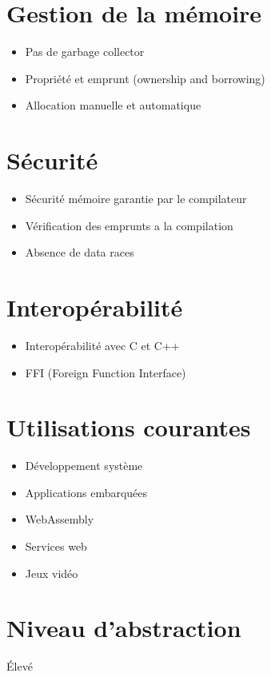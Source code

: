 \documentclass{article}
\begin{document}
\section{Gestion de la mémoire \cite{noauthor_what_nodate}} 
\begin{itemize}
    \item Pas de garbage collector
    \item Propriété et emprunt (ownership and borrowing)
    \item Allocation manuelle et automatique
\end{itemize}

\section{Sécurité}
\begin{itemize}
    \item Sécurité mémoire garantie par le compilateur
    \item Vérification des emprunts a la compilation
    \item Absence de data races
\end{itemize}

\section{Interopérabilité}
\begin{itemize}
    \item Interopérabilité avec C et C++
    \item FFI (Foreign Function Interface)
\end{itemize}

\section{Utilisations courantes}
\begin{itemize}
    \item Développement système
    \item Applications embarquées
    \item WebAssembly
    \item Services web
    \item Jeux vidéo
\end{itemize}

\section{Niveau d'abstraction}
Élevé
\end{document}
